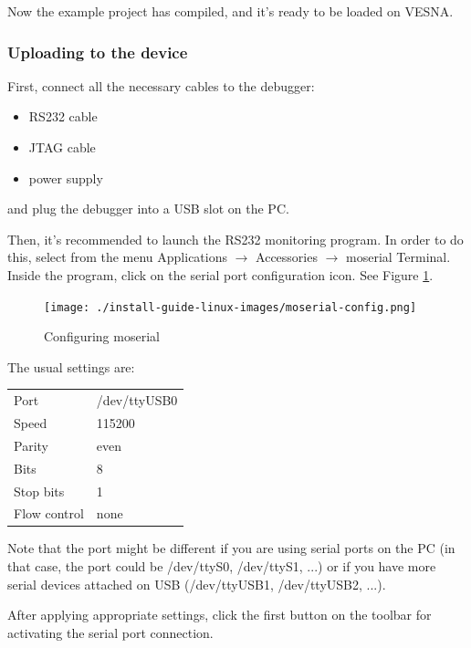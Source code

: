 \documentclass[a4paper, 10pt]{article}
\begin{document}
Now the example project has compiled, and it's ready to be loaded on VESNA.

\subsubsection{Uploading to the device}


First, connect all the necessary cables to the debugger:
    \begin{itemize}
    \item RS232 cable
    \item JTAG cable
    \item power supply
    \end{itemize}
and plug the debugger into a USB slot on the PC.

Then, it's recommended to launch the RS232 monitoring program.
In order to do this, select from the menu
Applications $\rightarrow$ Accessories $\rightarrow$ moserial Terminal.
Inside the program, click on the serial port configuration icon.
See Figure \ref{fig:moserial-config}.

    \begin{figure}[H]
    \centering
        \texttt{[image: ./install-guide-linux-images/moserial-config.png]}
        \caption{Configuring moserial}
        \label{fig:moserial-config}
    \end{figure}


The usual settings are:

    \smallskip
    \begin{tabular}{ l l }
    Port         & /dev/ttyUSB0 \\
    Speed        & 115200       \\
    Parity       & even         \\
    Bits         & 8            \\
    Stop bits    & 1            \\
    Flow control & none         \\
    \end{tabular}
    \smallskip

Note that the port might be different if you are using serial ports on the PC
(in that case, the port could be /dev/ttyS0, /dev/ttyS1, ...)
or if you have more serial devices attached on USB (/dev/ttyUSB1, /dev/ttyUSB2, ...).

After applying appropriate settings, click the first button on the toolbar for
activating the serial port connection.
\end{document}
